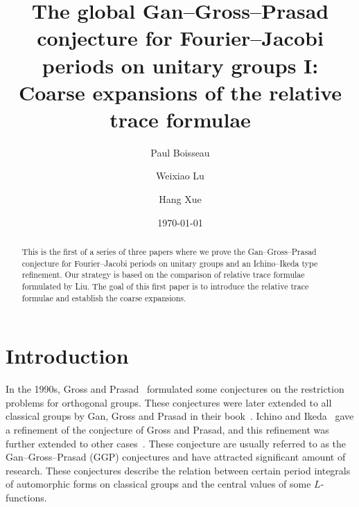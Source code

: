 \documentclass[letterpaper,11pt]{amsart}
\newcommand{\<}{\negthickspace}
\theoremstyle{definition}
\theoremstyle{plain}
\theoremstyle{remark}
\numberwithin{equation}{section}
\begin{document}
\title{The global Gan--Gross--Prasad conjecture for Fourier--Jacobi periods on unitary groups I: Coarse expansions of the relative trace formulae}

\author{Paul Boisseau}

\author{Weixiao Lu}

\author{Hang Xue}

\address{Paul Boisseau, Max Planck Institute for Mathematics, Vivatsgasse 7, 53111 Bonn, Germany}


\address{Weixiao Lu, Aix Marseille Univ, CNRS, I2M, Marseille, 13009, France}


\address{Hang Xue, Department of Mathematics, The University of Arizona, Tucson, AZ, 85721, USA}



\date{\today}

\begin{abstract}
This is the first of a series of three papers where we prove the Gan--Gross--Prasad conjecture for Fourier--Jacobi periods on unitary groups and an Ichino--Ikeda type refinement. Our strategy is based on the comparison of relative trace formulae formulated by Liu. The goal of this first paper is to introduce the relative trace formulae and establish the coarse expansions.
\end{abstract}

\maketitle

\tableofcontents



\section{Introduction}


In the 1990s, Gross and Prasad~\cites{GP1,GP2} formulated some conjectures on the
restriction problems for orthogonal groups. These conjectures were later
extended to all classical groups by Gan, Gross and Prasad in their
book~\cite{GGP}. Ichino and Ikeda~\cite{II} gave a refinement of the
conjecture of Gross and Prasad, and this refinement was further extended to
other cases~\cites{NHarris,Liu2,Xue2,Xue7}. These conjecture are usually
referred to as the Gan--Gross--Prasad (GGP) conjectures and have attracted
significant amount of research. These conjectures describe the relation
between certain period integrals of automorphic forms on classical groups and
the central values of some $L$-functions.
\end{document}
